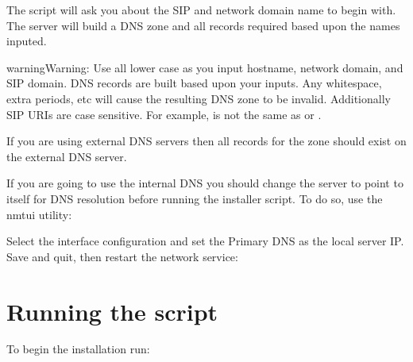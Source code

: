 \documentclass[letterpaper,10pt,english]{sphinxmanual}
\begin{document}
\begin{sphinxVerbatim}[commandchars=\\\{\}]
  
\end{sphinxVerbatim}

The script will ask you about the SIP and network domain name to begin with. The server will build a DNS zone and all records required based upon the names inputed.

\begin{sphinxadmonition}{warning}{Warning:}
Use all lower case as you input hostname, network domain, and SIP domain. DNS records are built based upon your inputs. Any whitespace, extra periods, etc will cause the resulting DNS zone to be invalid.
Additionally SIP URIs are case sensitive. For example,  is not the same as  or .
\end{sphinxadmonition}

If you are using external DNS servers then all records for the zone should exist on the external DNS server.

If you are going to use the internal DNS you should change the server to point to itself for DNS resolution before running the installer script. To do so, use the nmtui utility:

\begin{sphinxVerbatim}[commandchars=\\\{\}]
\end{sphinxVerbatim}

Select the interface configuration and set the Primary DNS as the local server IP. Save and quit, then restart the network service:

\begin{sphinxVerbatim}[commandchars=\\\{\}]
  
\end{sphinxVerbatim}


\section{Running the script}
\label{\detokenize{setupscript:running-the-script}}\label{\detokenize{setupscript:id1}}
To begin the installation run:

\begin{sphinxVerbatim}[commandchars=\\\{\}]
\end{sphinxVerbatim}
\end{document}
